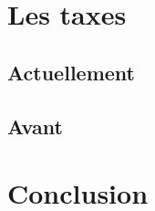 \documentclass[a4paper, 12pt]{extarticle}
\begin{document}
	\section{Les taxes}
	\subsection{Actuellement}  
	\subsection{Avant}
	\section{Conclusion}
		  
		
	\pagebreak
      
  \tableofcontents
\end{document}
